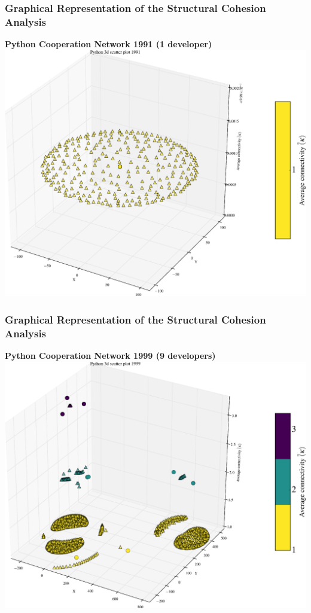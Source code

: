 \documentclass[ignorenonframetext,red,8pt,notes=hide]{beamer}
\begin{document}
\begin{frame}
\frametitle{Graphical Representation of the Structural Cohesion Analysis}

\begin{center}
\textbf{Python Cooperation Network 1991 (1 developer)}
\includegraphics[scale=0.25]{img/3d_scatter_python_1991}
\end{center}

\end{frame}


\begin{frame}
\frametitle{Graphical Representation of the Structural Cohesion Analysis}

\begin{center}
\textbf{Python Cooperation Network 1999 (9 developers)}
\includegraphics[scale=0.25]{img/3d_scatter_python_1999}
\end{center}

\end{frame}
\end{document}
